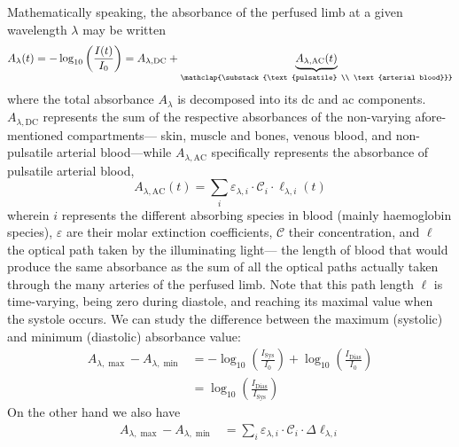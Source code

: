 Mathematically speaking, the absorbance of the perfused limb at a given wavelength $\lambda$ may be written
\begin{equation}
	A_\lambda(t) = - \log_{10}\left(\frac{I(t)}{I_0}\right) = A_{\lambda,\text{DC}} + \underbrace{A_{\lambda,\text{AC}}(t)}_{\mathclap{\substack{\text{pulsatile} \\ \text{arterial blood}}}}
\end{equation}
where the total absorbance $A_\lambda$ is decomposed into its \gls{dc} and \gls{ac} components. $A_{\lambda,\text{DC}}$ represents the sum of the respective absorbances of the non-varying afore-mentioned compartments---\ie{} skin, muscle and bones, venous blood, and non-pulsatile arterial blood---while $A_{\lambda,\text{AC}}$ specifically represents the absorbance of pulsatile arterial blood, \ie{}
\begin{equation}\label{eq:co2hb:beer_law}
	A_{\lambda,\text{AC}}(t) = \sum_{i} \varepsilon_{\lambda, i} \cdot \mathcal{C}_i \cdot \ell_{\lambda, i}(t)
\end{equation}
wherein $i$ represents the different absorbing species in blood (mainly haemoglobin species), $\varepsilon$ are their molar extinction coefficients, $\mathcal{C}$ their concentration, and $\ell$ the optical path taken by the illuminating light---\ie{} the length of blood that would produce the same absorbance as the sum of all the optical paths actually taken through the many arteries of the perfused limb. Note that this path length $\ell$ is time-varying, being zero during diastole, and reaching its maximal value when the systole occurs. We can study the difference between the maximum (systolic) and minimum (diastolic) absorbance value:
\begin{equation}\label{eq:co2hb:adiff_logi}
	\begin{aligned}
		A_{\lambda,\max} - A_{\lambda,\min} &= - \log_{10}\left(\frac{I_\text{Sys}}{I_0}\right) + \log_{10}\left(\frac{I_\text{Dias}}{I_0}\right)\\
		&= \log_{10}\left(\frac{I_\text{Dias}}{I_\text{Sys}}\right)
	\end{aligned}
\end{equation}
On the other hand we also have
\begin{equation}
	\begin{aligned}
		A_{\lambda,\max} - A_{\lambda,\min} &= \sum_{i} \varepsilon_{\lambda, i} \cdot \mathcal{C}_i \cdot \Delta\ell_{\lambda, i}
	\end{aligned}
\end{equation}
